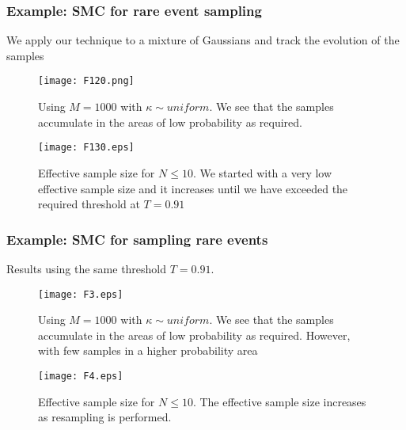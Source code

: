 \documentclass[aspectratio=169]{beamer}\usepackage[utf8]{inputenc}
\begin{document}
\begin{frame}\frametitle{Example: SMC for rare event sampling  }
We apply our technique to a mixture of  Gaussians and track the evolution of the samples
\begin{figure}[h!]
	\centering
	\begin{minipage}{.45\textwidth}
		\centering
		\texttt{[image: F120.png]}
		\caption{Using $M=1000$ with  $ \kappa \sim uniform $. We see that the samples accumulate in the areas of low probability as required.   }
		\label{Ex1}
	\end{minipage}%
	\begin{minipage}{.05\textwidth}
	\end{minipage}
	\begin{minipage}{.45\textwidth}
		\centering
		\texttt{[image: F130.eps]}
		\caption{Effective sample size for $N\leq10$. We started with a very low effective sample size and it increases until we have exceeded the required threshold at $T=0.91$}
		\label{Ex2}
	\end{minipage}
\end{figure}

\end{frame}

\begin{frame}\frametitle{Example: SMC for sampling rare events  }
Results using  the same threshold $T=0.91$.
\begin{figure}[h!]
	\centering
	\begin{minipage}{.45\textwidth}
		\centering
		\texttt{[image: F3.eps]}
		\caption{Using $M=1000$ with  $ \kappa \sim uniform $. We see that the samples accumulate in the areas of low probability as required. However, with few samples in a higher probability area    }
		\label{Ex1}
	\end{minipage}%
	\begin{minipage}{.05\textwidth}
	\end{minipage}
	\begin{minipage}{.45\textwidth}
		\centering
		\texttt{[image: F4.eps]}
		\caption{Effective sample size for $N\leq 10$. The effective sample size  increases as resampling is performed.  }
		\label{Ex2}
	\end{minipage}
\end{figure}
\end{frame}
\end{document}
